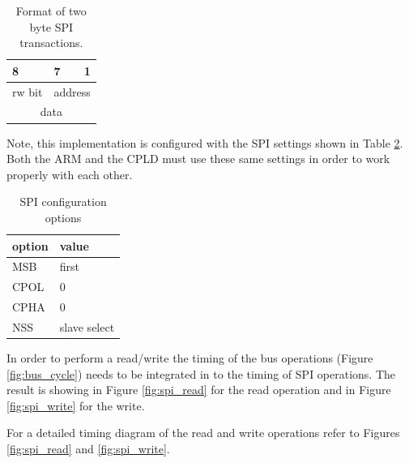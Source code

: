 \documentclass{article}
\begin{document}
\begin{table}[hbp]
\center
\begin{tabular}{|c|c|c|}
    \multicolumn{1}{l}{8} & \multicolumn{1}{l}{7} & \multicolumn{1}{r}{1} \\
\hline
rw bit & \multicolumn{2}{|c|}{address} \\
\hline
\multicolumn{3}{|c|}{data} \\
\hline
\end{tabular}
\caption{Format of two byte SPI transactions.}
\label{tbl:spiformat}
\end{table}

Note, this implementation is configured with the SPI settings
shown in Table \ref{tbl:spi}.
Both the ARM and the CPLD must use these same settings in order
to work properly with each other.

\begin{table}
\center
\begin{tabular}{|l|l|}
	\hline
	option & value \\
	\hline
	MSB & first \\
	CPOL & 0 \\
	CPHA & 0 \\
	NSS & slave select\\
	\hline
\end{tabular}
\caption{SPI configuration options}
\label{tbl:spi}
\end{table}

In order to perform a read/write the timing of the bus operations
(Figure \ref{fig:bus_cycle}) needs to be integrated in to the
timing of SPI operations.
The result is showing in Figure \ref{fig:spi_read} for the
read operation and in Figure \ref{fig:spi_write} for the write.

For a detailed timing diagram of the read and write operations refer
to Figures \ref{fig:spi_read} and \ref{fig:spi_write}.
\end{document}
